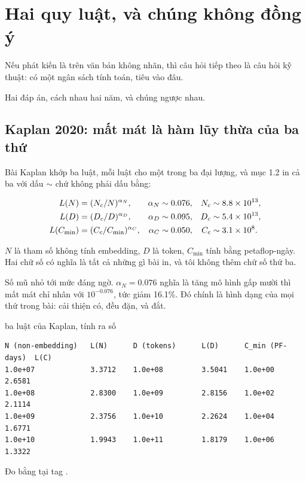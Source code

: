 \section{Hai quy luật, và chúng không đồng ý}
\label{sec:ch09-hai-quy-luat}

%
Nếu phát kiến là  trên văn bản không nhãn, thì
câu hỏi tiếp theo là câu hỏi kỹ thuật: có một ngân sách tính toán, tiêu vào đâu.

Hai đáp án, cách nhau hai năm, và chúng ngược nhau.

\subsection*{Kaplan 2020: mất mát là hàm lũy thừa của ba thứ}

Bài Kaplan khớp ba luật, mỗi luật cho một trong ba đại lượng, và mục 1.2 in cả
ba với dấu \(\sim\) chứ không phải dấu bằng:

\begin{align}
\label{eq:ch09-kaplan}
L(N) &= (N_c/N)^{\alpha_N}, & \alpha_N &\sim 0.076, & N_c &\sim 8.8 \times 10^{13}, \\
L(D) &= (D_c/D)^{\alpha_D}, & \alpha_D &\sim 0.095, & D_c &\sim 5.4 \times 10^{13}, \notag \\
L(C_{\min}) &= (C_c/C_{\min})^{\alpha_C}, & \alpha_C &\sim 0.050, & C_c &\sim 3.1 \times 10^{8}. \notag
\end{align}

\(N\) là tham số không tính embedding, \(D\) là token, \(C_{\min}\) tính bằng
petaflop-ngày. Hai chữ số có nghĩa là tất cả những gì bài in, và tôi không thêm
chữ số thứ ba.

Số mũ nhỏ tới mức đáng ngờ. \(\alpha_N = 0.076\) nghĩa là tăng mô hình gấp mười
thì mất mát chỉ nhân với \(10^{-0.076}\), tức giảm 16.1\%. Đó chính là
hình dạng của mọi thứ trong bài: cải thiện có, đều đặn, và đắt.

\begin{measured}{ba luật của Kaplan, tính ra số}
\begin{verbatim}
N (non-embedding)   L(N)      D (tokens)      L(D)      C_min (PF-days)  L(C)
1.0e+07             3.3712    1.0e+08         3.5041    1.0e+00          2.6581
1.0e+08             2.8300    1.0e+09         2.8156    1.0e+02          2.1114
1.0e+09             2.3756    1.0e+10         2.2624    1.0e+04          1.6771
1.0e+10             1.9943    1.0e+11         1.8179    1.0e+06          1.3322
\end{verbatim}

Đo bằng  tại tag .
\end{measured}

